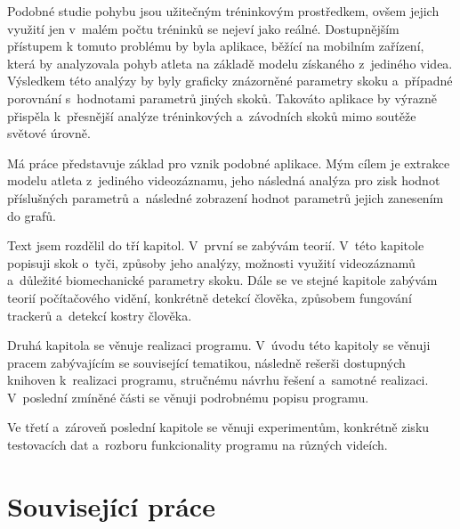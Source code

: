 Podobné studie pohybu jsou užitečným tréninkovým prostředkem, ovšem jejich využití jen v~malém počtu tréninků se nejeví jako reálné. Dostupnějším přístupem k tomuto problému by byla aplikace, běžící na mobilním zařízení, která by analyzovala pohyb atleta na základě modelu získaného z~jediného videa. Výsledkem této analýzy by byly graficky znázorněné parametry skoku a~případné porovnání s~hodnotami parametrů jiných skoků. Takováto aplikace by výrazně přispěla k~přesnější analýze tréninkových a~závodních skoků mimo soutěže světové úrovně.

Má práce představuje základ pro vznik podobné aplikace. Mým cílem je extrakce modelu atleta z~jediného videozáznamu, jeho následná analýza pro zisk hodnot příslušných parametrů a~následné zobrazení hodnot parametrů jejich zanesením do grafů.

Text jsem rozdělil do tří kapitol. V~první se zabývám teorií. V~této kapitole popisuji skok o~tyči, způsoby jeho analýzy, možnosti využití videozáznamů a~důležité biomechanické parametry skoku. Dále se ve stejné kapitole zabývám teorií počítačového vidění, konkrétně detekcí člověka, způsobem fungování trackerů a~detekcí kostry člověka.

Druhá kapitola se věnuje realizaci programu. V~úvodu této kapitoly se věnuji pracem zabývajícím se související tematikou, následně rešerši dostupných knihoven k~realizaci programu, stručnému návrhu řešení a~samotné realizaci. V~poslední zmíněné části se věnuji podrobnému popisu programu.

Ve třetí a~zároveň poslední kapitole se věnuji experimentům, konkrétně zisku testovacích dat a~rozboru funkcionality programu na různých videích.

\section{Související práce}
